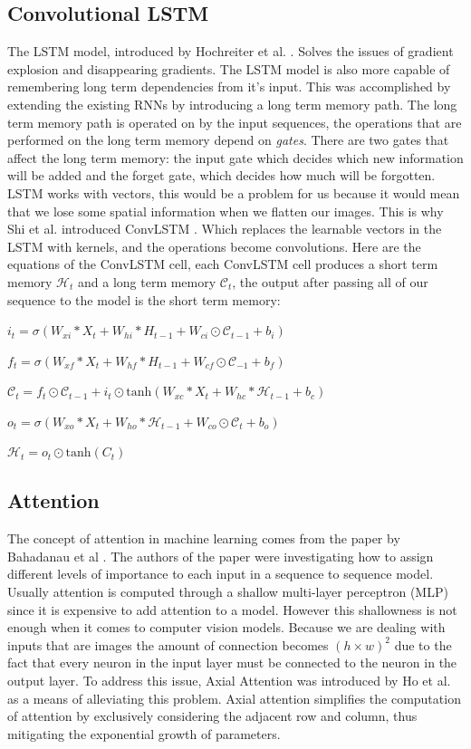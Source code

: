 \subsection{Convolutional LSTM}
The LSTM model, introduced by Hochreiter et al. \cite{lstm}. Solves the issues of gradient explosion and disappearing gradients.
The LSTM model is also more capable of remembering long term dependencies from it's input. This was accomplished by extending the existing RNNs by introducing a long term memory path.
The long term memory path is operated on by the input sequences, the operations that are performed on the long term memory
depend on \textit{gates}. There are two gates that affect the long term memory: the input gate which decides which new information will be added and the forget gate, which decides how much will be forgotten.
LSTM works with vectors, this would be a problem for us because it would mean that we lose some spatial information when we flatten our images. This is why Shi et al. introduced ConvLSTM \cite{convlstm}.
Which replaces the learnable vectors in the LSTM with kernels, and the operations become convolutions.
Here are the equations of the ConvLSTM cell, each ConvLSTM cell produces a short term memory $ \mathcal{H}_{t}$ and a long term memory $\mathcal{C}_{t}$,
the output after passing all of our sequence to the model is the short term memory:

$i_{t} = \sigma\left(W_{xi} * X_{t} + W_{hi} * H_{t-1} + W_{ci} \odot \mathcal{C}_{t-1} + b_{i}\right)$

$f_{t} = \sigma\left(W_{xf} * X_{t} + W_{hf} * H_{t-1} + W_{cf} \odot \mathcal{C}_{-1} + b_{f}\right)$

$\mathcal{C}_{t} = f_{t} \odot \mathcal{C}_{t-1} + i_{t} \odot \text{tanh}\left(W_{xc} * X_{t} + W_{hc} * \mathcal{H}_{t-1} + b_{c}\right)$

$o_{t} = \sigma\left(W_{xo} * X_{t} + W_{ho} * \mathcal{H}_{t-1} + W_{co} \odot \mathcal{C}_{t} + b_{o}\right)$

$ \mathcal{H}_{t} = o_{t} \odot \text{tanh}\left(C_{t}\right) $

\subsection{Attention}
The concept of attention in machine learning comes from the paper by Bahadanau et al \cite{bahdanau-2015}. The authors of
the paper were investigating how to assign different levels of importance to each input in a sequence to sequence model.
Usually attention is computed through a shallow multi-layer perceptron (MLP) since it is expensive to add attention to a model.
However this shallowness is not enough when it comes to computer vision models. Because we are dealing with inputs that are images the amount of connection becomes $(h\times w)^2$
due to the fact that every neuron in the input layer must be connected to the neuron in the output layer.
To address this issue, Axial Attention was introduced by Ho et al. \cite{DBLP:journals/corr/abs-1912-12180} as a means of alleviating this problem.
Axial attention simplifies the computation of attention by exclusively considering the adjacent row and column, thus mitigating the exponential growth of parameters.